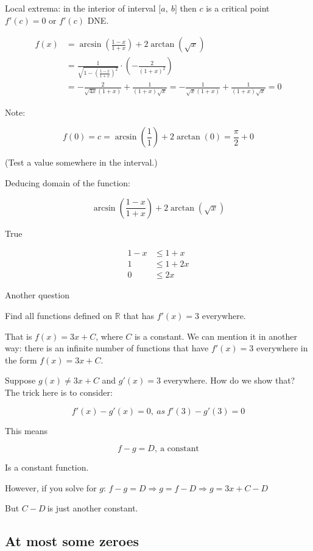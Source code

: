 \documentclass[12pt]{article}
\theoremstyle{plain}
\theoremstyle{remark}
\theoremstyle{definition}
\begin{document}
Local extrema: in the interior of interval \(\lbrack a,\ b\rbrack\) then
\(c\) is a critical point \(f'(c) = 0\) or \(f'(c)\) DNE.

\begin{align*}
f(x) &= \arcsin\left( \frac{1 - x}{1 + x} \right) + 2\arctan\left( \sqrt{x} \right) \\
&= \frac{1}{\sqrt{1 - \left( \frac{1 - x}{1 + x} \right)^{2}}} \cdot \left( - \frac{2}{(1 + x)^{2}} \right) \\
&= - \frac{2}{\sqrt{4x}(1 + x)} + \frac{1}{(1 + x)\sqrt{x}} = - \frac{1}{\sqrt{x}(1 + x)} + \frac{1}{(1 + x)\sqrt{x}} = 0
\end{align*}


Note:

\[f(0) = c = \arcsin\left( \frac{1}{1} \right) + 2\arctan(0) = \frac{\pi}{2} + 0\]

(Test a value somewhere in the interval.)

Deducing domain of the function:

\[\arcsin\left( \frac{1 - x}{1 + x} \right) + 2\arctan\left( \sqrt{x} \right)
\]

True

\begin{align*}
1 - x &\leq 1 + x \\
1 &\leq 1 + 2x \\
0 &\leq 2x
\end{align*}


Another question

Find all functions defined on \(\mathbb{R}\) that has \(f'(x) = 3\)
everywhere.

That is \(f(x) = 3x + C\), where \(C\) is a constant. We can mention it
in another way: there is an infinite number of functions that have
\(f'(x) = 3\) everywhere in the form \(f(x) = 3x + C\).

Suppose \(g(x) \neq 3x + C\) and \(g'(x) = 3\) everywhere. How do we
show that? The trick here is to consider:

\[f'(x) - g'(x) = 0,\ as\ f'(3) - g'(3) = 0\]

This means

\[f - g = D,\ \text{a\ constant}\]

Is a constant function.

However, if you solve for \(g\):
\(f - g = D \Rightarrow g = f - D \Rightarrow g = 3x + C - D\)

But \(C - D\ \)is just another constant.


\subsection{At most some zeroes}
\end{document}
